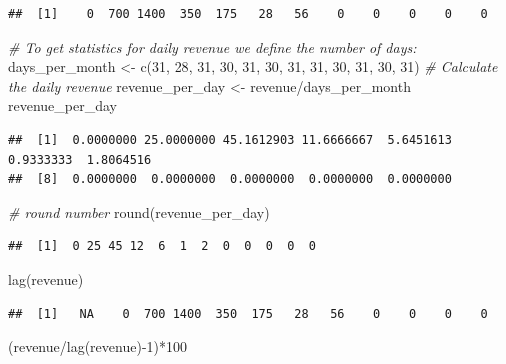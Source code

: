 \documentclass[
  12pt,
  oneside]{book}
\newenvironment{Shaded}{\begin{snugshade}}{\end{snugshade}}
\newcommand{\CommentTok}[1]{\textcolor[rgb]{0.56,0.35,0.01}{\textit{#1}}}
\newcommand{\DecValTok}[1]{\textcolor[rgb]{0.00,0.00,0.81}{#1}}
\newcommand{\FunctionTok}[1]{\textcolor[rgb]{0.00,0.00,0.00}{#1}}
\newcommand{\NormalTok}[1]{#1}
\newcommand{\OtherTok}[1]{\textcolor[rgb]{0.56,0.35,0.01}{#1}}
\newcommand{\SpecialCharTok}[1]{\textcolor[rgb]{0.00,0.00,0.00}{#1}}
\begin{document}
\begin{verbatim}
##  [1]    0  700 1400  350  175   28   56    0    0    0    0    0
\end{verbatim}

\begin{Shaded}
\begin{Highlighting}[]
\CommentTok{\# To get statistics for daily revenue we define the number of days:}
\NormalTok{days\_per\_month }\OtherTok{\textless{}{-}} \FunctionTok{c}\NormalTok{(}\DecValTok{31}\NormalTok{, }\DecValTok{28}\NormalTok{, }\DecValTok{31}\NormalTok{, }\DecValTok{30}\NormalTok{, }\DecValTok{31}\NormalTok{, }\DecValTok{30}\NormalTok{, }\DecValTok{31}\NormalTok{, }\DecValTok{31}\NormalTok{, }\DecValTok{30}\NormalTok{, }\DecValTok{31}\NormalTok{, }\DecValTok{30}\NormalTok{, }\DecValTok{31}\NormalTok{)}
\CommentTok{\# Calculate the daily revenue}
\NormalTok{revenue\_per\_day }\OtherTok{\textless{}{-}}\NormalTok{ revenue}\SpecialCharTok{/}\NormalTok{days\_per\_month}
\NormalTok{revenue\_per\_day }
\end{Highlighting}
\end{Shaded}

\begin{verbatim}
##  [1]  0.0000000 25.0000000 45.1612903 11.6666667  5.6451613  0.9333333  1.8064516
##  [8]  0.0000000  0.0000000  0.0000000  0.0000000  0.0000000
\end{verbatim}

\begin{Shaded}
\begin{Highlighting}[]
\CommentTok{\# round number }
\FunctionTok{round}\NormalTok{(revenue\_per\_day) }
\end{Highlighting}
\end{Shaded}

\begin{verbatim}
##  [1]  0 25 45 12  6  1  2  0  0  0  0  0
\end{verbatim}

\begin{Shaded}
\begin{Highlighting}[]
\FunctionTok{lag}\NormalTok{(revenue)}
\end{Highlighting}
\end{Shaded}

\begin{verbatim}
##  [1]   NA    0  700 1400  350  175   28   56    0    0    0    0
\end{verbatim}

\begin{Shaded}
\begin{Highlighting}[]
\NormalTok{(revenue}\SpecialCharTok{/}\FunctionTok{lag}\NormalTok{(revenue)}\SpecialCharTok{{-}}\DecValTok{1}\NormalTok{)}\SpecialCharTok{*}\DecValTok{100} 
\end{Highlighting}
\end{Shaded}
\end{document}
